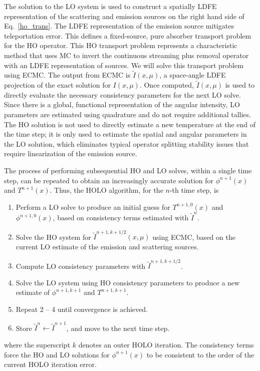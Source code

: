 \documentclass{mc2013}
\begin{document}
The solution to the LO system is used to construct a spatially LDFE representation of
the scattering and emission sources on the right hand side of Eq.~\eqref{ho_trans}.
The LDFE representation of the emission source mitigates teleportation error.
 This defines a fixed-source, pure absorber
transport problem for the HO operator. This HO transport problem represents a characteristic method that uses MC to
invert the continuous streaming plus removal operator with an LDFE representation of
sources. We will solve this transport problem using ECMC.  The output from ECMC is
$\tilde{I}(x,\mu)$, a space-angle LDFE projection of the exact solution for
$I(x,\mu)$.  Once computed, $\tilde{I}(x,\mu)$ is used
to directly evaluate the necessary consistency parameters for the next LO solve.  Since there is a global, functional representation of
the angular intensity,  LO parameters are estimated using quadrature and do not
require additional tallies.  The HO solution is not used to directly estimate a new
temperature at the end of the time step; it is
only used to estimate the spatial and angular parameters in the LO solution, which eliminates
typical operator splitting stability issues that require linearization of the emission source.

The process of performing subsequential HO and LO solves, within a single time step, can be repeated to obtain an increasingly accurate solution for $\phi^{n+1}(x)$ and $T^{n+1}(x)$.  Thus, the HOLO algorithm, for the $n$-th time step, is
\begin{enumerate}
\item Perform a LO solve to produce an initial guess for $T^{n+1,0}(x)$
    and $\phi^{n+1,0}(x)$, based on consistency terms estimated with $\tilde{I}^{n}$.
\item Solve the HO system for $\tilde{I}^{n+1,k+1/2}(x,\mu)$ using ECMC, based on the current
    LO estimate of the emission and scattering sources.%
\item Compute LO consistency parameters with $\tilde{I}^{n+1,k+1/2}$.  
\item Solve the LO system using HO consistency parameters to produce a new
    estimate of $\phi^{n+1,k+1}$ and $T^{n+1,k+1}$.
\item Repeat 2 -- 4 until convergence is achieved.
\item Store $\tilde{I}^{n}\leftarrow\tilde{I}^{n+1}$, and move to the next time step.
\end{enumerate}
where the superscript $k$ denotes an outer HOLO iteration.
The consistency terms force the HO
and LO solutions for $\phi^{n+1}(x)$ to be consistent to the order of the current HOLO
iteration error.
\end{document}
